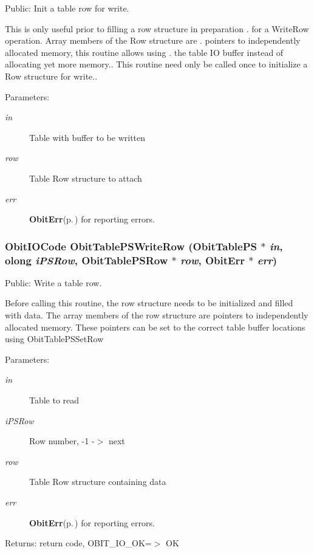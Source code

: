Public: Init a table row for write. 

This is only useful prior to filling a row structure in preparation . for a Write\-Row operation. Array members of the Row structure are . pointers to independently allocated memory, this routine allows using . the table IO buffer instead of allocating yet more memory.. This routine need only be called once to initialize a Row structure for write.. \begin{Desc}
\item[Parameters:]
\begin{description}
\item[{\em in}]Table with buffer to be written \item[{\em row}]Table Row structure to attach \item[{\em err}]{\bf Obit\-Err}{\rm (p.\,\pageref{structObitErr})} for reporting errors. \end{description}
\end{Desc}
\subsubsection{\setlength{\rightskip}{0pt plus 5cm}Obit\-IOCode Obit\-Table\-PSWrite\-Row ({\bf Obit\-Table\-PS} $\ast$ {\em in}, {\bf olong} {\em i\-PSRow}, {\bf Obit\-Table\-PSRow} $\ast$ {\em row}, {\bf Obit\-Err} $\ast$ {\em err})}\label{ObitTablePS_8h_a20}


Public: Write a table row. 

Before calling this routine, the row structure needs to be initialized and filled with data. The array members of the row structure are pointers to independently allocated memory. These pointers can be set to the correct table buffer locations using Obit\-Table\-PSSet\-Row \begin{Desc}
\item[Parameters:]
\begin{description}
\item[{\em in}]Table to read \item[{\em i\-PSRow}]Row number, -1 -$>$ next \item[{\em row}]Table Row structure containing data \item[{\em err}]{\bf Obit\-Err}{\rm (p.\,\pageref{structObitErr})} for reporting errors. \end{description}
\end{Desc}
\begin{Desc}
\item[Returns:]return code, OBIT\_\-IO\_\-OK=$>$ OK \end{Desc}
